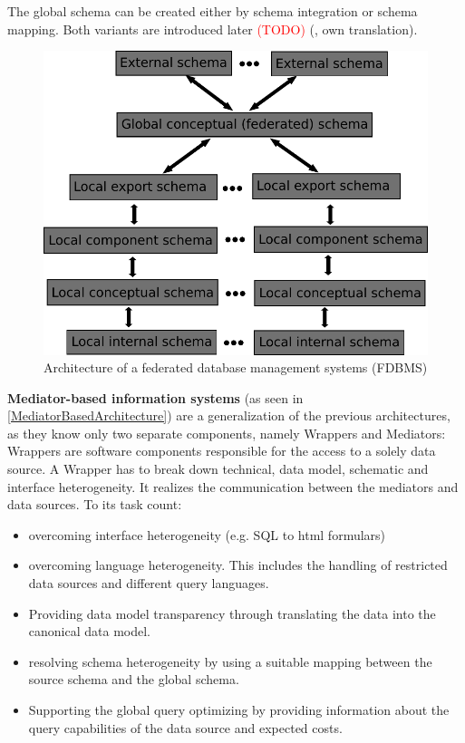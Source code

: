 The global schema can be created either by schema integration or schema mapping. Both variants are introduced later \textcolor{red}{(TODO)}
(\cite[p. 94/95]{DBLP:books/dp/LeserN2006}, own translation).\\
\begin{figure}[H]
	\begin{center}
		\includegraphics[scale=0.5]{figures/federatedDatabaseArchitecture.pdf}
	\end{center}
	\caption{Architecture of a  federated database management systems (FDBMS)}
	\label{FDBMSArchitecture}
\end{figure}

\textbf{Mediator-based information systems} (as seen in \ref{MediatorBasedArchitecture}) are a generalization of the previous architectures, as they know only two separate components, namely Wrappers and Mediators: Wrappers are software components responsible for the access to a solely data source. A Wrapper has to break down technical, data model, schematic and interface heterogeneity. It realizes the communication between the mediators and data sources. To its task count:
\begin{itemize}
\item overcoming interface heterogeneity (e.g. SQL to html formulars)
\item overcoming language heterogeneity. This includes the handling of restricted data sources and different query languages.
\item Providing data model transparency through translating the data into the canonical data model.
\item resolving schema heterogeneity by using a suitable mapping between the source schema and the global schema.
\item Supporting the global query optimizing by providing information about the query capabilities of the data source and expected costs.
\end{itemize}

